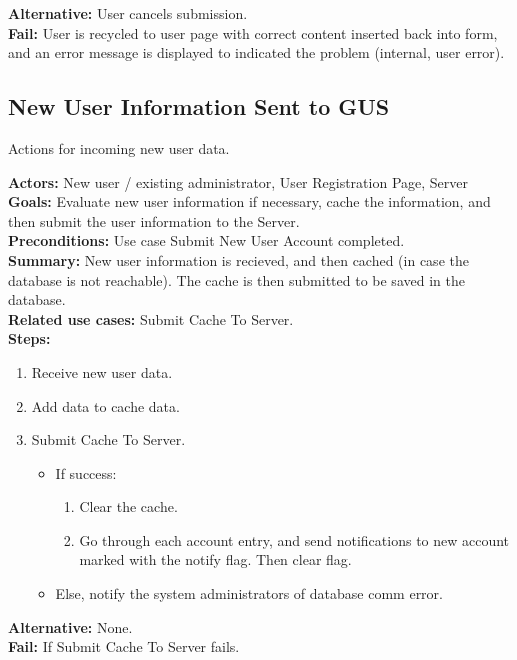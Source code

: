 \documentclass[12pt]{article}
\begin{document}
   
 \textbf{Alternative:} User cancels submission. \\
  
  
 \textbf{Fail:} User is recycled to user page with correct content
      inserted back into form, and an error message is
      displayed to indicated the problem (internal, user
      error). \\


 \subsection{New User Information Sent to GUS}
   Actions for incoming new user data.
 
 \textbf{Actors:} New user / existing administrator,
                  User Registration Page, Server \\

 
 \textbf{Goals:} Evaluate new user information if
                 necessary, cache the information,
                 and then submit the user information
                 to the Server. \\
 
 
 \textbf{Preconditions:} Use case Submit New User Account
                         completed. \\
 
 
 \textbf{Summary:} New user information is recieved, and then
                   cached (in case the database is not reachable).
                   The cache is then submitted to be saved in the
                   database. \\
 
 
 \textbf{Related use cases:} Submit Cache To Server. \\
 
 
 \textbf{Steps:}
\begin{enumerate}
  \item Receive new user data.
  \item Add data to cache data.
  \item Submit Cache To Server.
  \begin{itemize}
   \item If success:
   \begin{enumerate}
    \item Clear the cache.
    \item Go through each account entry, and send notifications to
          new account marked with the notify flag. Then clear flag.
   \end{enumerate}
   \item Else, notify the system administrators of database comm error.
  \end{itemize}
\end{enumerate}
   
   
 \textbf{Alternative:} None. \\
  
  
 \textbf{Fail:} If Submit Cache To Server fails. \\
\end{document}
